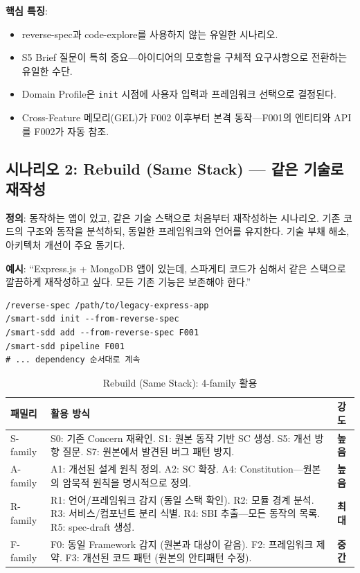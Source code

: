 \documentclass[11pt,a4paper,openright,twoside]{report}
\begin{document}
\textbf{핵심 특징}:
\begin{itemize}[nosep]
  \item reverse-spec과 code-explore를 사용하지 않는 유일한 시나리오.
  \item S5 Brief 질문이 특히 중요---아이디어의 모호함을 구체적 요구사항으로 전환하는 유일한 수단.
  \item Domain Profile은 \texttt{init} 시점에 사용자 입력과 프레임워크 선택으로 결정된다.
  \item Cross-Feature 메모리(GEL)가 F002 이후부터 본격 동작---F001의 엔티티와 API를 F002가 자동 참조.
\end{itemize}


\subsection{시나리오 2: Rebuild (Same Stack) --- 같은 기술로 재작성}
\label{sec:ref-rebuild-same}

\textbf{정의}: 동작하는 앱이 있고, 같은 기술 스택으로 처음부터 재작성하는 시나리오. 기존 코드의 구조와 동작을 분석하되, 동일한 프레임워크와 언어를 유지한다. 기술 부채 해소, 아키텍처 개선이 주요 동기다.

\textbf{예시}: ``Express.js + MongoDB 앱이 있는데, 스파게티 코드가 심해서 같은 스택으로 깔끔하게 재작성하고 싶다. 모든 기존 기능은 보존해야 한다.''

\begin{lstlisting}
/reverse-spec /path/to/legacy-express-app
/smart-sdd init --from-reverse-spec
/smart-sdd add --from-reverse-spec F001
/smart-sdd pipeline F001
# ... dependency 순서대로 계속
\end{lstlisting}

\begin{table}[H]
\centering
\caption{Rebuild (Same Stack): 4-family 활용}
\label{tab:ref-rebuild-same}
\begin{tabularx}{\textwidth}{lXl}
\toprule
\textbf{패밀리} & \textbf{활용 방식} & \textbf{강도} \\
\midrule
S-family &
  S0: 기존 Concern 재확인. S1: 원본 동작 기반 SC 생성. S5: 개선 방향 질문. S7: 원본에서 발견된 버그 패턴 방지. &
  \textbf{높음} \\
\addlinespace
A-family &
  A1: 개선된 설계 원칙 정의. A2: SC 확장. A4: Constitution---원본의 암묵적 원칙을 명시적으로 정의. &
  \textbf{높음} \\
\addlinespace
R-family &
  R1: 언어/프레임워크 감지 (동일 스택 확인). R2: 모듈 경계 분석. R3: 서비스/컴포넌트 분리 식별. R4: SBI 추출---모든 동작의 목록. R5: spec-draft 생성. &
  \textbf{최대} \\
\addlinespace
F-family &
  F0: 동일 Framework 감지 (원본과 대상이 같음). F2: 프레임워크 제약. F3: 개선된 코드 패턴 (원본의 안티패턴 수정). &
  \textbf{중간} \\
\bottomrule
\end{tabularx}
\end{table}
\end{document}
